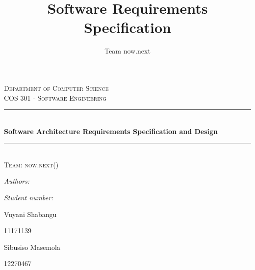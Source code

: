 \documentclass{article}
\author{Team now.next}
\title{ Software Requirements Specification}
\newcommand{\HRule}{\rule{\linewidth}{0.5mm}}
\begin{document}
	\setlength{\parskip}{6pt}
	
	\begin{titlepage}
		
		\begin{center}
			
			\textsc{\LARGE Department of Computer Science}\\[1.5cm]
			\textsc{\Large COS 301 - Software Engineering}\\[0.5cm]
			\HRule \\[0.4cm]
			{ \huge \bfseries Software Architecture Requirements Specification and Design}\\[0.4cm]
			\HRule \\[0.4cm]
			\textsc{\Large Team:  now.next()}\\[0.5cm]
			\begin{minipage}{0.4\textwidth}
				\begin{flushleft} \large
					\emph{Authors:}
				\end{flushleft}
			\end{minipage}
			\begin{minipage}{0.4\textwidth}
				\begin{flushright} \large
					\emph{Student number:}
				\end{flushright}
			\end{minipage}
			
			\begin{minipage}{0.4\textwidth}
				\begin{flushleft} \large
					Vuyani {Shabangu}
				\end{flushleft}
			\end{minipage}
			\begin{minipage}{0.4\textwidth}
				\begin{flushright} \large
					\emph{}
					11171139
				\end{flushright}
			\end{minipage}
			
			\begin{minipage}{0.4\textwidth}
				\begin{flushleft} \large
					Sibusiso {Masemola}
				\end{flushleft}
			\end{minipage}
			\begin{minipage}{0.4\textwidth}
				\begin{flushright} \large
					\emph{}
					12270467
				\end{flushright}
			\end{minipage}
			

\end{center}
\end{titlepage}
\end{document}

